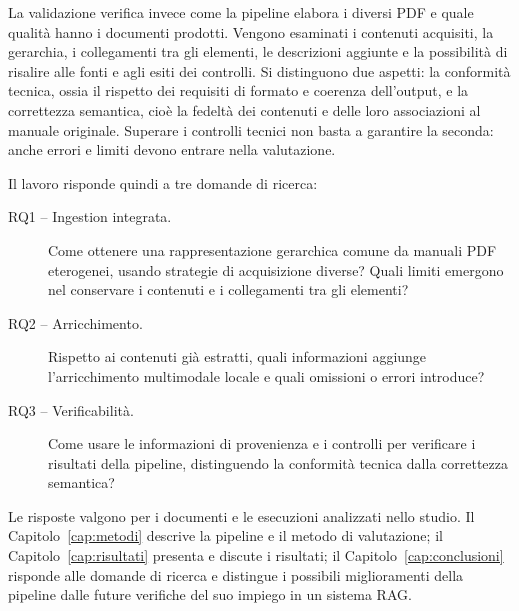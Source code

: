 La validazione verifica invece come la pipeline elabora i diversi PDF e quale qualità hanno i documenti prodotti. Vengono esaminati i contenuti acquisiti, la gerarchia, i collegamenti tra gli elementi, le descrizioni aggiunte e la possibilità di risalire alle fonti e agli esiti dei controlli. Si distinguono due aspetti: la conformità tecnica, ossia il rispetto dei requisiti di formato e coerenza dell'output, e la correttezza semantica, cioè la fedeltà dei contenuti e delle loro associazioni al manuale originale. Superare i controlli tecnici non basta a garantire la seconda: anche errori e limiti devono entrare nella valutazione.

\label{sec:rq}
Il lavoro risponde quindi a tre domande di ricerca:
\begin{description}
    \item[RQ1 -- Ingestion integrata.] Come ottenere una rappresentazione gerarchica comune da manuali PDF eterogenei, usando strategie di acquisizione diverse? Quali limiti emergono nel conservare i contenuti e i collegamenti tra gli elementi?
    \item[RQ2 -- Arricchimento.] Rispetto ai contenuti già estratti, quali informazioni aggiunge l'arricchimento multimodale locale e quali omissioni o errori introduce?
    \item[RQ3 -- Verificabilità.] Come usare le informazioni di provenienza e i controlli per verificare i risultati della pipeline, distinguendo la conformità tecnica dalla correttezza semantica?
\end{description}

Le risposte valgono per i documenti e le esecuzioni analizzati nello studio. Il Capitolo~\ref{cap:metodi} descrive la pipeline e il metodo di valutazione; il Capitolo~\ref{cap:risultati} presenta e discute i risultati; il Capitolo~\ref{cap:conclusioni} risponde alle domande di ricerca e distingue i possibili miglioramenti della pipeline dalle future verifiche del suo impiego in un sistema RAG.